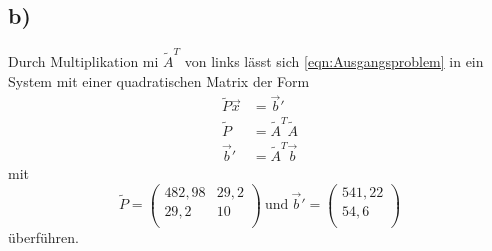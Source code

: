 \subsection{b)}
Durch Multiplikation mi $\tilde{A}^T$ von links lässt sich \eqref{eqn:Ausgangsproblem}
in ein System mit einer quadratischen Matrix der Form
\begin{align}
  \tilde{P} \vec{x} &= \vec{b}' \\
  \label{eqn:symm-Problem}
  \tilde{P} &= \tilde{A}^T \tilde{A} \\
  \vec{b}' &= \tilde{A}^T \vec{b}
\end{align}
mit
\begin{equation*}
  \tilde{P} =
  \begin{pmatrix}
    482,98 & 29,2 \\
    29,2 & 10 \\
  \end{pmatrix}
  \ \text{und} \ \vec{b}' =
  \begin{pmatrix}
    541,22 \\
    54,6 \\
  \end{pmatrix}
\end{equation*}
überführen.

